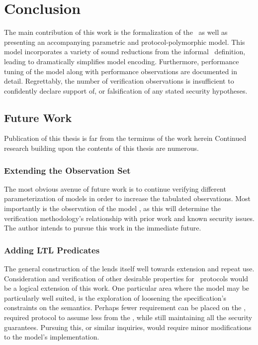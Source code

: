 \hypertarget{sec:conclusion}{%
\chapter{Conclusion}\label{sec:conclusion}}

The main contribution of this work is the formalization of the \CGKAsec\ as well as presenting an accompanying parametric and protocol-polymorphic  model.
This \CGKAmod{}{}{} model incorporates a variety of sound reductions from the informal \CGKAsec\ definition, leading to dramatically simplifies model encoding.
Furthermore, performance tuning of the model along with performance observations are documented in detail.
Regrettably, the number of verification observations is insufficient to confidently declare support of, or falsification of any stated security hypotheses.


\hypertarget{sec:future-work}{%
\section{Future Work}\label{sec:future-work}}

Publication of this thesis is far from the terminus of the work herein
Continued research building upon the contents of this thesis are numerous.


\hypertarget{sec:more-observations}{%
\subsection{Extending the Observation Set}\label{sec:more-observations}}

The most obvious avenue of future work is to continue verifying different parameterization of  models in order to increase the tabulated observations.
Most importantly is the observation of the model , as this will determine the verification methodology's relationship with prior work and known security issues.
The author intends to pursue this work in the immediate future.


\hypertarget{sec:more-predicates}{%
\subsection{Adding LTL Predicates}\label{sec:more-predicates}}

The general construction of the  lends itself well towards extension and repeat use.
Consideration and verification of other desirable properties for \CGKAdef\ protocols would be a logical extension of this work.
One particular area where the  model may be particularly well suited, is the exploration of loosening the  specification's constraints on the  semantics.
Perhaps fewer requirement can be placed on the , required protocol to assume less from the , while still maintaining all the  security guarantees.
Pursuing this, or similar inquiries, would require minor modifications to the  model's implementation.



